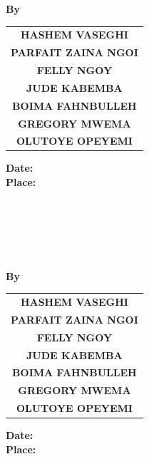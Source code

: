 \documentclass[a4paper,12pt]{extreport}
\begin{document}
\onehalfspacing %
\justifying %
\centering
\logo \\[3em]
\textbf{\LARGE \universityname} \\[1em]
\textbf{\Large \facultyname} \\[1em]
\textbf{\large \departmentname} \\[3em]
\textbf{\Huge \projecttitle} \\[2em]
\textbf{\Large By} \\[1em]
\begin{tabular}[pos]{c} 
    \textbf{\uppercase{hashem vaseghi}}      \\[0.5em] 
    \textbf{\uppercase{Parfait Zaina Ngoi}}  \\[0.5em]
    \textbf{\uppercase{Felly Ngoy}}          \\[0.5em]
    \textbf{\uppercase{Jude Kabemba}}        \\[0.5em]
    \textbf{\uppercase{Boima Fahnbulleh}}   \\[0.5em]
    \textbf{\uppercase{Gregory Mwema}}     \\[0.5em]
    \textbf{\uppercase{Olutoye Opeyemi}}   \\[0.5em]
\end{tabular}
\vfill
\textbf{ Date: \reportdate} \\[1em]
\textbf{ Place: \reportplace} \\[1em]

\newpage

\centering
\logo \\[3em]
\textbf{\LARGE \universityname} \\[1em]
\textbf{\Large \facultyname} \\[1em]
\textbf{\large \departmentname} \\[3em]
\textbf{\Huge \projecttitle} \\[2em]
\textbf{\Large By} \\[1em]
\begin{tabular}[pos]{c} 
    \textbf{\uppercase{hashem vaseghi}}      \\[0.5em]
    \textbf{\uppercase{Parfait Zaina Ngoi}}  \\ [0.5em]
    \textbf{\uppercase{Felly Ngoy}}          \\ [0.5em] 
    \textbf{\uppercase{Jude Kabemba}}        \\ [0.5em]
    \textbf{\uppercase{Boima Fahnbulleh}}   \\[0.5em]
    \textbf{\uppercase{Gregory Mwema}}     \\[0.5em]
    \textbf{\uppercase{Olutoye Opeyemi}}   \\[0.5em]
\end{tabular}
\vfill
\textbf{ Date: \reportdate} \\[1em]
\textbf{ Place: \reportplace} \\[1em]
\end{document}
